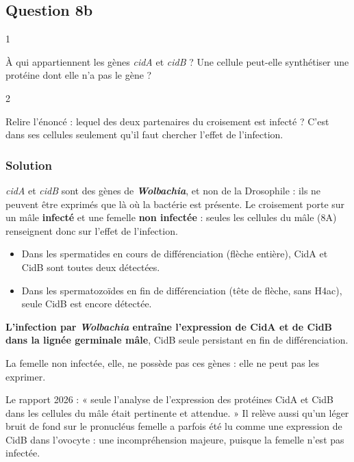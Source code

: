 \documentclass[11pt,a4paper]{article}
\providecommand{\tightlist}{\setlength{\itemsep}{0pt}\setlength{\parskip}{0pt}}
\begin{document}
\hypertarget{question-8b}{%
\subsection{Question 8b}\label{question-8b}}

\begin{indication}{1}

À qui appartiennent les gènes \emph{cidA} et \emph{cidB} ? Une cellule peut-elle synthétiser une protéine dont elle n'a pas le gène ?

\end{indication}

\begin{indication}{2}

Relire l'énoncé : lequel des deux partenaires du croisement est infecté ? C'est dans ses cellules seulement qu'il faut chercher l'effet de l'infection.

\end{indication}

\hypertarget{solution-58}{%
\subsubsection{Solution}\label{solution-58}}

\emph{cidA} et \emph{cidB} sont des gènes de \textbf{\emph{Wolbachia}}, et non de la Drosophile : ils ne peuvent être exprimés que là où la bactérie est présente. Le croisement porte sur un mâle \textbf{infecté} et une femelle \textbf{non infectée} : seules les cellules du mâle (8A) renseignent donc sur l'effet de l'infection.

\begin{itemize}
\tightlist
\item
  Dans les spermatides en cours de différenciation (flèche entière), CidA et CidB sont toutes deux détectées.
\item
  Dans les spermatozoïdes en fin de différenciation (tête de flèche, sans H4ac), seule CidB est encore détectée.
\end{itemize}

\textbf{L'infection par \emph{Wolbachia} entraîne l'expression de CidA et de CidB dans la lignée germinale mâle}, CidB seule persistant en fin de différenciation.

La femelle non infectée, elle, ne possède pas ces gènes : elle ne peut pas les exprimer.

\begin{piege}

Le rapport 2026 : « seule l'analyse de l'expression des protéines CidA et CidB dans les cellules du mâle était pertinente et attendue. » Il relève aussi qu'un léger bruit de fond sur le pronucléus femelle a parfois été lu comme une expression de CidB dans l'ovocyte : une incompréhension majeure, puisque la femelle n'est pas infectée.

\end{piege}
\end{document}
